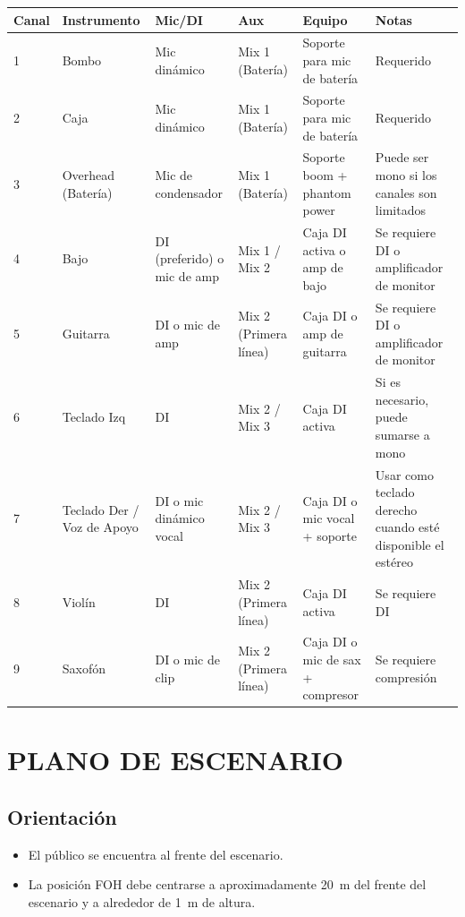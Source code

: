 \documentclass[a4paper,12pt]{article}
\newcommand{\sect}[1]{\section*{\normalfont\Large\bfseries\MakeUppercase{#1}}}
\begin{document}
\begin{center}
    \renewcommand{\arraystretch}{1.5}
    \small
    \begin{tabularx}{\textwidth}{@{} l >{\raggedright\arraybackslash}X >{\raggedright\arraybackslash}X >{\raggedright\arraybackslash}X >{\raggedright\arraybackslash}X >{\raggedright\arraybackslash}X @{}}
        \toprule
        \textbf{Canal} & \textbf{Instrumento} & \textbf{Mic/DI} & \textbf{Aux} & \textbf{Equipo} & \textbf{Notas} \\
        \midrule
        1 & Bombo & Mic dinámico & Mix 1 (Batería) & Soporte para mic de batería & Requerido \\
        2 & Caja & Mic dinámico & Mix 1 (Batería) & Soporte para mic de batería & Requerido \\
        3 & Overhead (Batería) & Mic de condensador & Mix 1 (Batería) & Soporte boom + phantom power & Puede ser mono si los canales son limitados \\
        4 & Bajo & DI (preferido) o mic de amp & Mix 1 / Mix 2 & Caja DI activa o amp de bajo & Se requiere DI o amplificador de monitor \\
        5 & Guitarra & DI o mic de amp & Mix 2 (Primera línea) & Caja DI o amp de guitarra & Se requiere DI o amplificador de monitor \\
        6 & Teclado Izq & DI & Mix 2 / Mix 3 & Caja DI activa & Si es necesario, puede sumarse a mono \\
        7 & Teclado Der / Voz de Apoyo & DI o mic dinámico vocal & Mix 2 / Mix 3 & Caja DI o mic vocal + soporte & Usar como teclado derecho cuando esté disponible el estéreo \\
        8 & Violín & DI & Mix 2 (Primera línea) & Caja DI activa & Se requiere DI \\
        9 & Saxofón & DI o mic de clip & Mix 2 (Primera línea) & Caja DI o mic de sax + compresor & Se requiere compresión \\
        \bottomrule
    \end{tabularx}
\end{center}

\sect{Plano de Escenario}

\subsection*{Orientación}

\begin{itemize}[leftmargin=1.4em, itemsep=0.3em]
    \item El público se encuentra al frente del escenario.
    \item La posición FOH debe centrarse a aproximadamente 20~m del frente del escenario y a alrededor de 1~m de altura.
\end{itemize}
\end{document}
